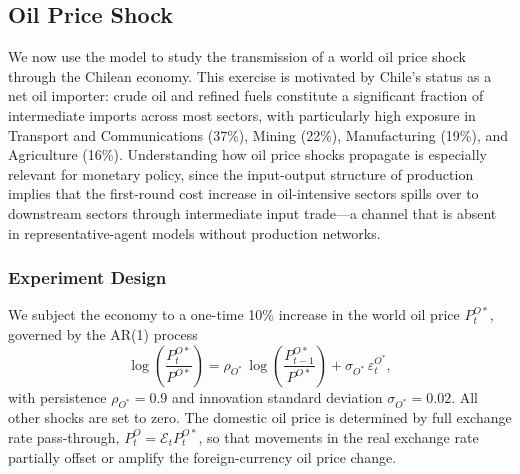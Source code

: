 
\subsection{Oil Price Shock}\label{sec:oil_shock}

We now use the model to study the transmission of a world oil price shock through the Chilean economy.
This exercise is motivated by Chile's status as a net oil importer: crude oil and refined fuels constitute a significant fraction of intermediate imports across most sectors, with particularly high exposure in Transport and Communications (37\%), Mining (22\%), Manufacturing (19\%), and Agriculture (16\%).
Understanding how oil price shocks propagate is especially relevant for monetary policy, since the input-output structure of production implies that the first-round cost increase in oil-intensive sectors spills over to downstream sectors through intermediate input trade---a channel that is absent in representative-agent models without production networks.

\subsubsection{Experiment Design}

We subject the economy to a one-time 10\% increase in the world oil price $P^{O*}_t$, governed by the AR(1) process
\begin{equation}
    \log\left(\frac{P^{O*}_t}{P^{O*}}\right) = \rho_{O^*}\,\log\left(\frac{P^{O*}_{t-1}}{P^{O*}}\right) + \sigma_{O^*}\,\varepsilon^{O^*}_t,
    \label{eq:oil_process}
\end{equation}
with persistence $\rho_{O^*} = 0.9$ and innovation standard deviation $\sigma_{O^*} = 0.02$.
All other shocks are set to zero.
The domestic oil price is determined by full exchange rate pass-through, $P^O_t = \mathcal{E}_t P^{O*}_t$, so that movements in the real exchange rate partially offset or amplify the foreign-currency oil price change.

